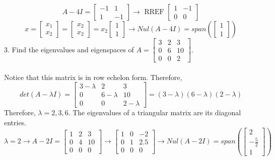 \begin{enumerate}
\[
  A - 4I = \begin{bmatrix} -1 & 1 \\ 1 & -1 \end{bmatrix} \rightarrow 
  \text{ RREF } \begin{bmatrix} 1 & -1 \\ 0 & 0 \end{bmatrix}
\]
\[
  x = \begin{bmatrix} x_1 \\ x_2 \end{bmatrix} = \begin{bmatrix}
  x_2 \\ x_2 \end{bmatrix} = x_2 \begin{bmatrix} 1 \\ 1 \end{bmatrix}
  \rightarrow Nul(A - 4I) = span(\begin{bmatrix} 1 \\ 1 \end{bmatrix})
\]
  3. Find the eigenvalues and eigenspaces of $A = \begin{bmatrix} 3 & 2 
  & 3 \\ 0 & 6 & 10 \\ 0 & 0 & 2 \end{bmatrix}$. \\\\ 
  Notice that this matrix is in row echelon form. Therefore,  
\[
  det(A - \lambda I) = \begin{bmatrix} 3 - \lambda & 2 & 3 \\ 
  0 & 6 - \lambda & 10 \\ 0 & 0 & 2 - \lambda \end{bmatrix} = 
  (3 - \lambda)(6 - \lambda)(2 - \lambda)
\]
Therefore, $\lambda = 2, 3, 6$. The eigenvalues of a triangular 
matrix are its diagonal entries. 
\[
  \lambda = 2 \rightarrow A - 2I = \begin{bmatrix} 1 & 2 & 3 \\
  0 & 4 & 10 \\ 0 & 0 & 0 \end{bmatrix} \rightarrow 
    \begin{bmatrix} 1 & 0 & -2 \\ 0 & 1 & 2.5 \\ 0 & 0 & 0 
      \end{bmatrix} \rightarrow Nul(A - 2I) = span(\begin{bmatrix}
    2 \\ -\frac{5}{2} \\ 1 \end{bmatrix})
\]
\end{enumerate}
